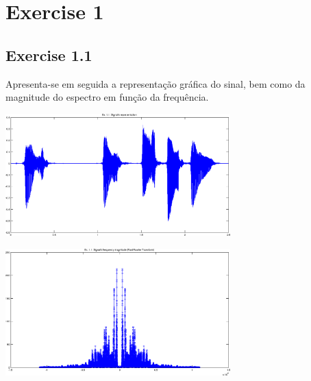 \documentclass[a4paper]{article}
\title{\documentTitle}
\author{\documentAuthors}
\begin{document}
\maketitle
\cleardoublepage

\tableofcontents
\cleardoublepage

\setlength{\parindent}{1cm}
\setlength{\parskip}{0.3cm}

\section{Exercise 1}
\subsection{Exercise 1.1}
\indent \indent Apresenta-se em seguida a representação gráfica do sinal, bem como da magnitude do espectro em função da frequência.
\begin{center}
	\includegraphics[width=0.65\textwidth]{images/ex_1_1_sign.png}
\end{center}

\begin{center}
	\includegraphics[width=0.65\textwidth]{images/ex_1_1_mag.png}
\end{center}
\end{document}

